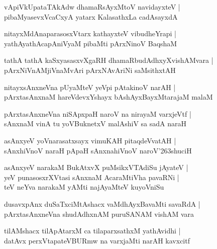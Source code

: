 \documentclass[twoside,12pt,openright]{book}
\def\S{\char'263}
\newcounter{shloka}[chapter]
\begin{document}
\begin{shloka}
vApiVkUpataTAkAdw dhamaRsAyxMtoV navidayxteV |\\
pibaMyasevxVcaCxyA yatarx KalasathxLa cadAsayxdA 
\end{shloka}

\begin{shloka}
nitayxMdAnaparasosxVtarx kathayxteV vibudheYrapi |\\
yathAyathAcapAniVyaM pibaMti pArxNinoV BaqshaM 
\end{shloka}

\begin{shloka}
tathA tathA kaSxyasasxvXgaRH dhamaRbudAdhxyXvishAMvara |\\
pArxNiVnAMjiVnaMvAri pArxNAvAriNi saMsithxtAH 
\end{shloka}

\begin{shloka}
nitayxsAnxneVna pUyaMteV yeVpi pAtakinoV narAH |\\
pArxtasAnxnaM hareVdevxYshayx bAshAyxBayxMtarajaM malaM 
\end{shloka}

\begin{shloka}
pArxtasAnxneVna niSApxpaH naroV na nirayaM varxjeVtf |\\
sAnxnaM vinA tu yoVBuknetxV malAshiV sa sadA naraH 
\end{shloka}

\begin{shloka}
asAnxyeV yoVnarasatxsayx vimuKAH pitaqdeVvatAH |\\
sAnxhiVnoV naraH pApaH sAnxnahiVnoV naroV\S shuciH 
\end{shloka}

\begin{shloka}
asAnxyeV narakaM BukAtxvX puMsikxVTAdiSu jAyateV |\\
yeV punasosxrXVtasi sAnxnaM AcaraMtiVha pavaRNi |\\
teV neYva narakaM yAMti najAyaMteV kuyoVniSu
\end{shloka}

\begin{shloka}
dusavxpAnx duSaTxciMtAshacx vaMdhAyxBavaMti savaRdA |\\
pArxtasAnxneVna shudAdhxnAM puruSANAM vishAM vara 
\end{shloka}

\begin{shloka}
tilAMshacx tilApAtarxM ca tilaparxsathxM yathAvidhi |\\
datAvx perxVtapateVBURmw na varxjaMti narAH kavxcitf 
\end{shloka}
\end{document}
